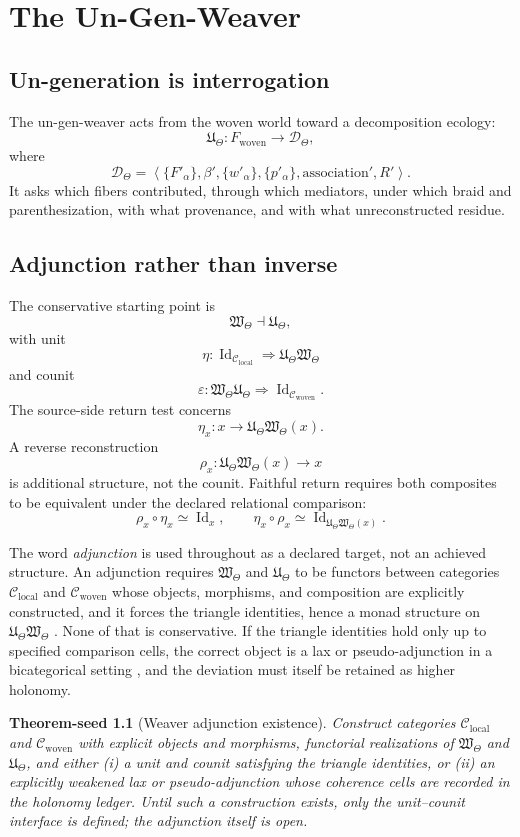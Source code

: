 \documentclass[12pt,openany]{book}
\newtheorem{theoremseed}[definition]{Theorem-seed}
\theoremstyle{remark}
\DeclareMathOperator{\Id}{Id}
\newcommand{\WTheta}{\mathfrak W_{\Theta}}
\newcommand{\UTheta}{\mathfrak U_{\Theta}}
\newcommand{\typedtuple}[1]{\left\langle #1 \right\rangle}
\begin{document}
\chapter{The Un-Gen-Weaver}
\label{ch:un-gen-weaver}

\section{Un-generation is interrogation}
The un-gen-weaver acts from the woven world toward a decomposition ecology:
\[
\UTheta:F_{\mathrm{woven}}\longrightarrow\mathcal D_\Theta,
\]
where
\[
\mathcal D_\Theta
=
\typedtuple{
\{F'_\alpha\},
\beta',
\{w'_\alpha\},
\{p'_\alpha\},
\text{association}',
R'
}.
\]
It asks which fibers contributed, through which mediators, under which braid and parenthesization, with what provenance, and with what unreconstructed residue.

\section{Adjunction rather than inverse}
The conservative starting point is
\[
\WTheta\dashv\UTheta,
\]
with unit
\[
\eta:\Id_{\mathcal C_{\mathrm{local}}}
\Longrightarrow
\UTheta\WTheta
\]
and counit
\[
\varepsilon:\WTheta\UTheta
\Longrightarrow
\Id_{\mathcal C_{\mathrm{woven}}}.
\]
The source-side return test concerns
\[
\eta_x:x\longrightarrow\UTheta\WTheta(x).
\]
A reverse reconstruction
\[
\rho_x:\UTheta\WTheta(x)\longrightarrow x
\]
is additional structure, not the counit. Faithful return requires both composites to be equivalent under the declared relational comparison:
\[
\rho_x\circ\eta_x\simeq\Id_x,
\qquad
\eta_x\circ\rho_x\simeq\Id_{\UTheta\WTheta(x)}.
\]

The word \emph{adjunction} is used throughout as a declared target, not an achieved structure. An adjunction requires $\WTheta$ and $\UTheta$ to be functors between categories $\mathcal C_{\mathrm{local}}$ and $\mathcal C_{\mathrm{woven}}$ whose objects, morphisms, and composition are explicitly constructed, and it forces the triangle identities, hence a monad structure on $\UTheta\WTheta$ \cite{MacLane}. None of that is conservative. If the triangle identities hold only up to specified comparison cells, the correct object is a lax or pseudo-adjunction in a bicategorical setting \cite{Benabou}, and the deviation must itself be retained as higher holonomy.

\begin{theoremseed}[Weaver adjunction existence]
Construct categories $\mathcal C_{\mathrm{local}}$ and $\mathcal C_{\mathrm{woven}}$ with explicit objects and morphisms, functorial realizations of $\WTheta$ and $\UTheta$, and either (i) a unit and counit satisfying the triangle identities, or (ii) an explicitly weakened lax or pseudo-adjunction whose coherence cells are recorded in the holonomy ledger. Until such a construction exists, only the unit--counit \emph{interface} is defined; the adjunction itself is open.
\end{theoremseed}
\end{document}

